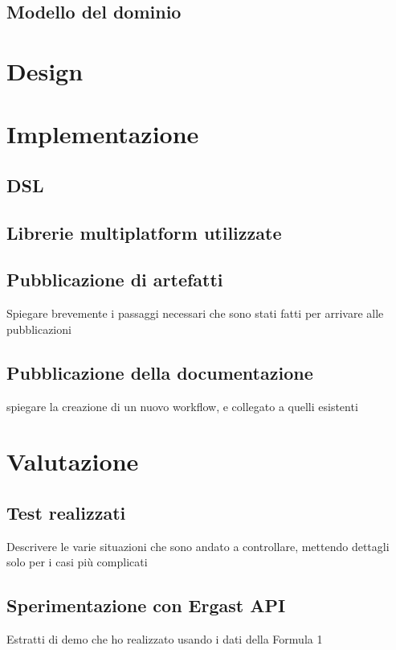 \documentclass[12pt,a4paper,openright,twoside]{book}
\begin{document}
\section{Modello del dominio}
\chapter{Design}
\chapter{Implementazione}

\section{DSL }

\section{Librerie multiplatform utilizzate}

\section{Pubblicazione di artefatti}
Spiegare brevemente i passaggi necessari che sono stati fatti per arrivare
alle pubblicazioni

\section{Pubblicazione della documentazione}
spiegare la creazione di un nuovo workflow, e collegato a quelli esistenti
\chapter{Valutazione}

\section{Test realizzati}
Descrivere le varie situazioni che sono andato a controllare,
mettendo dettagli solo per i casi più complicati

\section{Sperimentazione con Ergast API}
Estratti di demo che ho realizzato usando i dati della Formula 1
\end{document}
